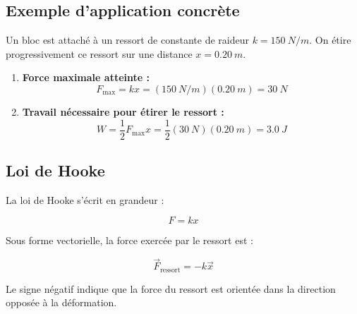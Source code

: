\documentclass[11pt,openany]{book}
\begin{document}
\begin{center}
\setlength{\fboxsep}{10pt}
\end{center}

\subsection*{Exemple d'application concrète}

Un bloc est attaché à un ressort de constante de raideur $k = \SI{150}{N/m}$. On étire progressivement ce ressort sur une distance $x = \SI{0.20}{m}$.

\begin{enumerate}
    \item \textbf{Force maximale atteinte :}
    \[
    F_{\text{max}} = k x = (\SI{150}{N/m})(\SI{0.20}{m}) = \SI{30}{N}
    \]

    \item \textbf{Travail nécessaire pour étirer le ressort :}
    \[
    W = \frac{1}{2} F_{\text{max}} x = \frac{1}{2} (\SI{30}{N})(\SI{0.20}{m}) = \SI{3.0}{J}
    \]
\end{enumerate}

\subsection{Loi de Hooke}

La loi de Hooke s'écrit en grandeur :

\[
\boxed{F = kx}
\]

Sous forme vectorielle, la force exercée par le ressort est :

\[
\boxed{\vec{F}_{\mathrm{ressort}} = -k\vec{x}}
\]

Le signe négatif indique que la force du ressort est orientée dans la direction opposée à la déformation.
\end{document}
